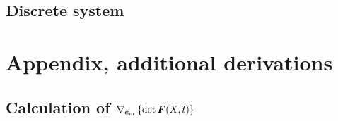 \documentclass[a4paper,11pt]{article}
\newcommand{\Nk}{\mathcal{N}_k}
\newcommand{\Or}{\Omega_0}
\newcommand{\intor}{\intl{\Or}{}}
\DeclareMathOperator{\divergence}{\nabla}
\newcommand{\sumnk}{\suml{i\in{\Nk}}{}}
\newcommand{\Dp}[1]{\nabla\varphi_{#1}(X)}
\newcommand{\dpk}{\Dp{k}}
\newcommand{\dpi}{\Dp{i}}
\newcommand{\dpj}{\Dp{j}}
\begin{document}
\subsection{Discrete system}


\newpage
\section{Appendix, additional derivations}

\subsection{Calculation of $\nabla_{\boldsymbol{c}_m}\left\{\det \boldsymbol{F}(X,t)\right\}$}





\end{document}

